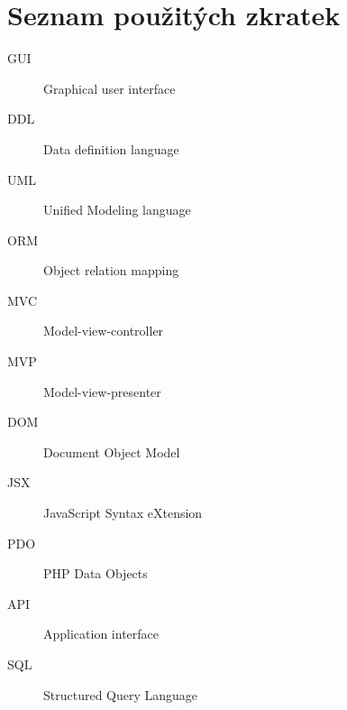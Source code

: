 \documentclass[thesis=B,czech]{FITthesis}[2012/06/26]
\begin{document}





\appendix

\chapter{Seznam použitých zkratek}
\begin{description}
	\item[GUI] Graphical user interface
	\item[DDL] Data definition language
	\item[UML] Unified Modeling language
	\item[ORM] Object relation mapping
	\item[MVC] Model-view-controller
	\item[MVP] Model-view-presenter
	\item[DOM] Document Object Model
	\item[JSX] JavaScript Syntax eXtension
	\item[PDO] PHP Data Objects
	\item[API] Application interface
	\item[SQL] Structured Query Language
\end{description}
\end{document}
